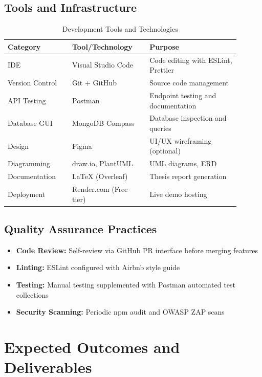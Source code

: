 \subsection{Tools and Infrastructure}

\begin{table}[H]
\centering
\caption{Development Tools and Technologies}
\label{tab:dev_tools}
\begin{tabular}{@{}p{0.25\linewidth}p{0.30\linewidth}p{0.35\linewidth}@{}}
\toprule
\textbf{Category} & \textbf{Tool/Technology} & \textbf{Purpose} \\
\midrule
IDE & Visual Studio Code & Code editing with ESLint, Prettier \\
Version Control & Git + GitHub & Source code management \\
API Testing & Postman & Endpoint testing and documentation \\
Database GUI & MongoDB Compass & Database inspection and queries \\
Design & Figma & UI/UX wireframing (optional) \\
Diagramming & draw.io, PlantUML & UML diagrams, ERD \\
Documentation & LaTeX (Overleaf) & Thesis report generation \\
Deployment & Render.com (Free tier) & Live demo hosting \\
\bottomrule
\end{tabular}
\end{table}

\subsection{Quality Assurance Practices}

\begin{itemize}
    \item \textbf{Code Review:} Self-review via GitHub PR interface before merging features
    \item \textbf{Linting:} ESLint configured with Airbnb style guide
    \item \textbf{Testing:} Manual testing supplemented with Postman automated test collections
    \item \textbf{Security Scanning:} Periodic npm audit and OWASP ZAP scans
\end{itemize}

\section{Expected Outcomes and Deliverables}

